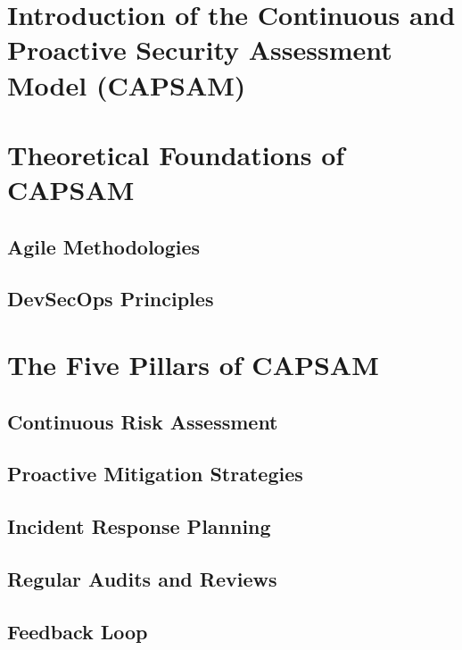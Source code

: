 \section{Introduction of the Continuous and Proactive Security Assessment Model (CAPSAM)}

\section{Theoretical Foundations of CAPSAM}
    \subsection{Agile Methodologies}

    \subsection{DevSecOps Principles}

\section{The Five Pillars of CAPSAM}

    \subsection{Continuous Risk Assessment}

    \subsection{Proactive Mitigation Strategies}

    \subsection{Incident Response Planning}

    \subsection{Regular Audits and Reviews}

    \subsection{Feedback Loop}

